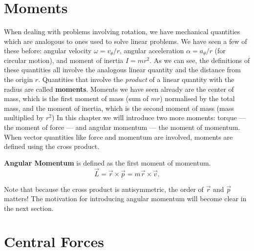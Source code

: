 \documentclass[../classical_mechanics.tex]{subfiles}
\begin{document}

    \section{Moments}
        \paragraph{}
        When dealing with problems involving rotation, we have mechanical quantities which are analogous to ones used to solve linear problems.
        We have seen a few of these before: angular velocity $\omega=v_\theta/r$, angular acceleration $\alpha=a_\theta/r$ (for circular motion), and moment of inertia $I=mr^2$.
        As we can see, the definitions of these quantities all involve the analogous linear quantity and the distance from the origin $r$.
        Quantities that involve the \textit{product} of a linear quantity with the radius are called \textbf{moments}.
        Moments we have seen already are the center of mass, which is the first moment of mass (sum of $mr$) normalised by the total mass, and the moment of inertia, which is the second moment of mass (mass multiplied by $r^2$)
        In this chapter we will introduce two more moments: torque --- the moment of force --- and angular momentum --- the moment of momentum.
        When vector quantities like force and momentum are involved, moments are defined using the cross product.
        \begin{definition}
            \textbf{Angular Momentum} is defined as the first moment of momentum.
            \begin{equation}
                \vec{L}=\vec{r}\times\vec{p}=m\vec{r}\times\vec{v}.
            \end{equation}
        \end{definition}
        Note that because the cross product is antisymmetric, the order of $\vec{r}$ and $\vec{p}$ matters!
        The motivation for introducing angular momentum will become clear in the next section. 

    \section{Central Forces}
\end{document}
